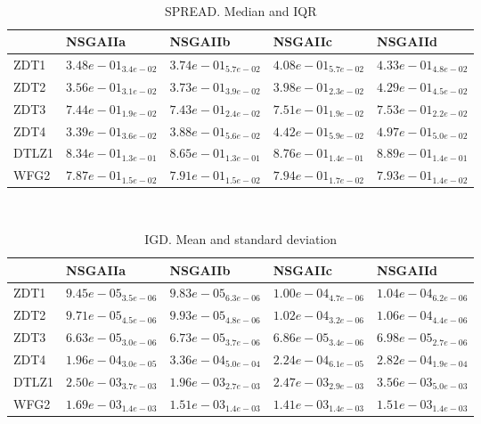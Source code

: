 \documentclass{article}
\begin{document}
\
\begin{table}
\caption{SPREAD. Median and IQR}
\label{table:median.SPREAD}
\begin{scriptsize}
\centering
\begin{tabular}{lllll}
\hline & NSGAIIa & NSGAIIb & NSGAIIc &  NSGAIId\\
\hline
ZDT1 & \cellcolor{gray95}$  3.48e-01_{ 3.4e-02}$ & \cellcolor{gray25}$  3.74e-01_{ 5.7e-02}$ & $  4.08e-01_{ 5.7e-02}$ & $  4.33e-01_{ 4.8e-02}$ \\
ZDT2 & \cellcolor{gray95}$  3.56e-01_{ 3.1e-02}$ & \cellcolor{gray25}$  3.73e-01_{ 3.9e-02}$ & $  3.98e-01_{ 2.3e-02}$ & $  4.29e-01_{ 4.5e-02}$ \\
ZDT3 & \cellcolor{gray25}$  7.44e-01_{ 1.9e-02}$ & \cellcolor{gray95}$  7.43e-01_{ 2.4e-02}$ & $  7.51e-01_{ 1.9e-02}$ & $  7.53e-01_{ 2.2e-02}$ \\
ZDT4 & \cellcolor{gray95}$  3.39e-01_{ 3.6e-02}$ & \cellcolor{gray25}$  3.88e-01_{ 5.6e-02}$ & $  4.42e-01_{ 5.9e-02}$ & $  4.97e-01_{ 5.0e-02}$ \\
DTLZ1 & \cellcolor{gray95}$  8.34e-01_{ 1.3e-01}$ & \cellcolor{gray25}$  8.65e-01_{ 1.3e-01}$ & $  8.76e-01_{ 1.4e-01}$ & $  8.89e-01_{ 1.4e-01}$ \\
WFG2 & \cellcolor{gray95}$  7.87e-01_{ 1.5e-02}$ & \cellcolor{gray25}$  7.91e-01_{ 1.5e-02}$ & $  7.94e-01_{ 1.7e-02}$ & $  7.93e-01_{ 1.4e-02}$ \\
\hline
\end{tabular}
\end{scriptsize}
\end{table}
\
\begin{table}
\caption{IGD. Mean and standard deviation}
\label{table:mean.IGD}
\centering
\begin{scriptsize}
\begin{tabular}{lllll}
\hline & NSGAIIa & NSGAIIb & NSGAIIc &  NSGAIId\\
\hline
ZDT1 & \cellcolor{gray95}$  9.45e-05_{ 3.5e-06}$ & \cellcolor{gray25}$  9.83e-05_{ 6.3e-06}$ & $  1.00e-04_{ 4.7e-06}$ & $  1.04e-04_{ 6.2e-06}$ \\
ZDT2 & \cellcolor{gray95}$  9.71e-05_{ 4.5e-06}$ & \cellcolor{gray25}$  9.93e-05_{ 4.8e-06}$ & $  1.02e-04_{ 3.2e-06}$ & $  1.06e-04_{ 4.4e-06}$ \\
ZDT3 & \cellcolor{gray95}$  6.63e-05_{ 3.0e-06}$ & \cellcolor{gray25}$  6.73e-05_{ 3.7e-06}$ & $  6.86e-05_{ 3.4e-06}$ & $  6.98e-05_{ 2.7e-06}$ \\
ZDT4 & \cellcolor{gray95}$  1.96e-04_{ 3.0e-05}$ & $  3.36e-04_{ 5.0e-04}$ & \cellcolor{gray25}$  2.24e-04_{ 6.1e-05}$ & $  2.82e-04_{ 1.9e-04}$ \\
DTLZ1 & $  2.50e-03_{ 3.7e-03}$ & \cellcolor{gray95}$  1.96e-03_{ 2.7e-03}$ & \cellcolor{gray25}$  2.47e-03_{ 2.9e-03}$ & $  3.56e-03_{ 5.0e-03}$ \\
WFG2 & $  1.69e-03_{ 1.4e-03}$ & \cellcolor{gray25}$  1.51e-03_{ 1.4e-03}$ & \cellcolor{gray95}$  1.41e-03_{ 1.4e-03}$ & $  1.51e-03_{ 1.4e-03}$ \\
\hline
\end{tabular}
\end{scriptsize}
\end{table}
\end{document}
